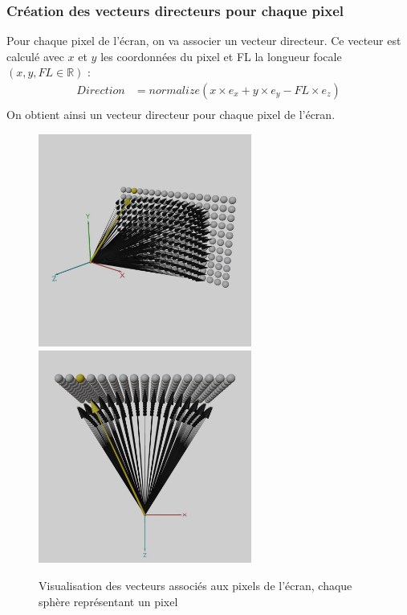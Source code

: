 \subsubsection{Création des vecteurs directeurs pour chaque pixel}
Pour chaque pixel de l'écran, on va associer un vecteur directeur. Ce vecteur est calculé avec $x$ et $y$ les coordonnées du pixel et FL la longueur focale $(x,y,FL\in \mathbb{R})$ : 
\begin{align*}
    Direction &= normalize(x\times e_x + y\times e_y - FL\times e_z)\\
\end{align*}
\noindent
On obtient ainsi un vecteur directeur pour chaque pixel de l'écran.
\begin{figure}[h]
    \centering
    \includegraphics[width=7cm]{images/vectorscreen1white.jpg}
    \includegraphics[width=7cm]{images/vectorscreen2white.jpg}
    \caption{Visualisation des vecteurs associés aux pixels de l'écran, chaque sphère représentant un pixel }
    \label{fig:screenvectors}
\end{figure}